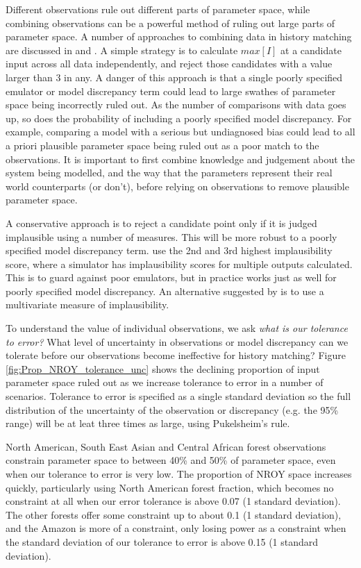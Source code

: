 \documentclass[esd, article]{copernicus} %
\begin{document}
Different observations rule out different parts of parameter space, while combining observations can be a powerful method of ruling out large parts of parameter space. A number of approaches to combining data in history matching are discussed in \cite{vernon2010galaxy} and \cite{williamson2013history}. A simple strategy is to calculate $max[I]$ at a candidate input across all data independently, and reject those candidates with a value larger than 3 in any. A danger of this approach is that a single poorly specified emulator or model discrepancy term could lead to large swathes of parameter space being incorrectly ruled out. As the number of comparisons with data goes up, so does the probability of including a poorly specified model discrepancy. For example, comparing a model with a serious but undiagnosed bias could lead to all a priori plausible parameter space being ruled out as a poor match to the observations. It is important to first combine knowledge and judgement about the system being modelled, and the way that the parameters represent their real world counterparts (or don't), before relying on observations to remove plausible parameter space.

A conservative approach is to reject a candidate point only if it is judged implausible using a number of measures. This will be more robust to a poorly specified model discrepancy term. \cite{vernon2010galaxy} use the 2nd and 3rd highest implausibility score, where a simulator has implausibility scores for multiple outputs calculated. This is to guard against poor emulators, but in practice works just as well for poorly specified model discrepancy. An alternative suggested by \cite{vernon2010galaxy} is to use a multivariate measure of implausibility.

To understand the value of individual observations, we ask \emph{what is our tolerance to error?} What level of uncertainty in observations or model discrepancy  can we tolerate before our observations become ineffective for history matching? Figure \ref{fig:Prop_NROY_tolerance_unc} shows the declining proportion of input parameter space ruled out as we increase tolerance to error in a number of scenarios. Tolerance to error is specified as a single standard deviation so the full distribution of the uncertainty of the observation or discrepancy (e.g. the 95\% range) will be at leat three times as large, using Pukelsheim's rule.

North American, South East Asian and Central African forest observations constrain parameter space to between 40\% and 50\% of parameter space, even when our tolerance to error is very low. The proportion of NROY space increases quickly, particularly using North American forest fraction, which becomes no constraint at all when our error tolerance is above 0.07 (1 standard deviation). The other forests offer some constraint up to about 0.1 (1 standard deviation), and the Amazon is more of a constraint, only losing power as a constraint when the standard deviation of our tolerance to error is above 0.15 (1 standard deviation).
\end{document}
